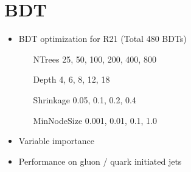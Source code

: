 \chapter{BDT}
\label{sec:bdt}

\begin{itemize}
\item BDT optimization for R21 (Total 480 BDTs)
  \begin{itemize}
  \item[NTrees] 25, 50, 100, 200, 400, 800
  \item[Depth] 4, 6, 8, 12, 18
  \item[Shrinkage] 0.05, 0.1, 0.2, 0.4
  \item[MinNodeSize] 0.001, 0.01, 0.1, 1.0
  \end{itemize}


\item Variable importance

\item Performance on gluon / quark initiated jets

\end{itemize}
